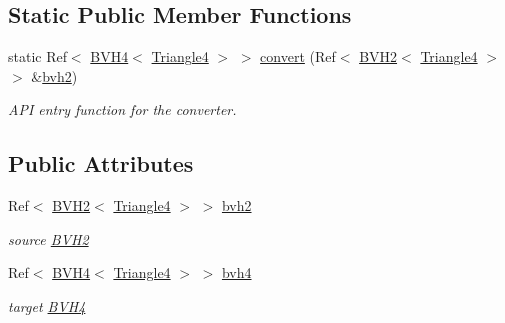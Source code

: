 \subsection*{Static Public Member Functions}
\begin{DoxyCompactItemize}
\item 
\hypertarget{classembree_1_1_b_v_h2_to_b_v_h4_aec56fef2aa254f04b8b8af4cfc36c34a}{
static Ref$<$ \hyperlink{classembree_1_1_b_v_h4}{BVH4}$<$ \hyperlink{structembree_1_1_triangle4}{Triangle4} $>$ $>$ \hyperlink{classembree_1_1_b_v_h2_to_b_v_h4_aec56fef2aa254f04b8b8af4cfc36c34a}{convert} (Ref$<$ \hyperlink{classembree_1_1_b_v_h2}{BVH2}$<$ \hyperlink{structembree_1_1_triangle4}{Triangle4} $>$ $>$ \&\hyperlink{classembree_1_1_b_v_h2_to_b_v_h4_afa8903905c8d426ac4cf1fdcd4fe65c6}{bvh2})}
\label{classembree_1_1_b_v_h2_to_b_v_h4_aec56fef2aa254f04b8b8af4cfc36c34a}

\begin{DoxyCompactList}\small\item\em API entry function for the converter. \item\end{DoxyCompactList}\end{DoxyCompactItemize}
\subsection*{Public Attributes}
\begin{DoxyCompactItemize}
\item 
\hypertarget{classembree_1_1_b_v_h2_to_b_v_h4_afa8903905c8d426ac4cf1fdcd4fe65c6}{
Ref$<$ \hyperlink{classembree_1_1_b_v_h2}{BVH2}$<$ \hyperlink{structembree_1_1_triangle4}{Triangle4} $>$ $>$ \hyperlink{classembree_1_1_b_v_h2_to_b_v_h4_afa8903905c8d426ac4cf1fdcd4fe65c6}{bvh2}}
\label{classembree_1_1_b_v_h2_to_b_v_h4_afa8903905c8d426ac4cf1fdcd4fe65c6}

\begin{DoxyCompactList}\small\item\em source \hyperlink{classembree_1_1_b_v_h2}{BVH2} \item\end{DoxyCompactList}\item 
\hypertarget{classembree_1_1_b_v_h2_to_b_v_h4_ac0488327c2c25d97d16394f7fe81ba32}{
Ref$<$ \hyperlink{classembree_1_1_b_v_h4}{BVH4}$<$ \hyperlink{structembree_1_1_triangle4}{Triangle4} $>$ $>$ \hyperlink{classembree_1_1_b_v_h2_to_b_v_h4_ac0488327c2c25d97d16394f7fe81ba32}{bvh4}}
\label{classembree_1_1_b_v_h2_to_b_v_h4_ac0488327c2c25d97d16394f7fe81ba32}

\begin{DoxyCompactList}\small\item\em target \hyperlink{classembree_1_1_b_v_h4}{BVH4} \item\end{DoxyCompactList}\end{DoxyCompactItemize}


